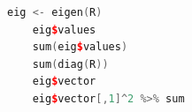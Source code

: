 \begin{lstlisting}[language=c++,label={code:09_08},caption={相関行列の固有値分解}]
    eig <- eigen(R)
    eig$values
    sum(eig$values)
    sum(diag(R))
    eig$vector
    eig$vector[,1]^2 %>% sum
\end{lstlisting}

